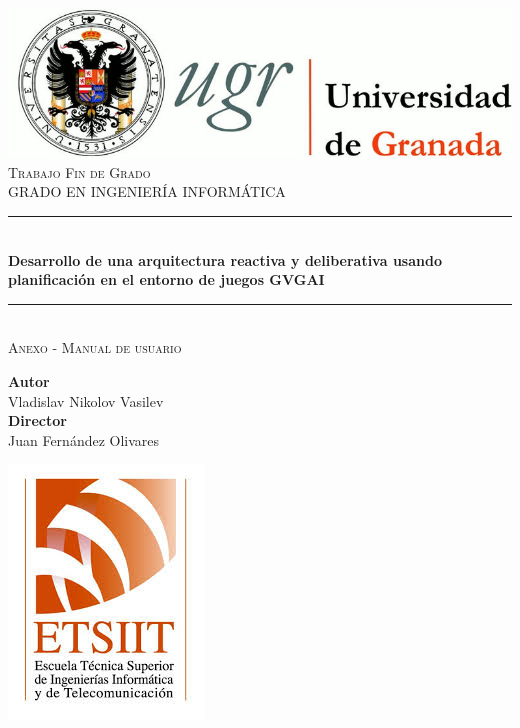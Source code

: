 \documentclass[11pt,a4paper]{article}
\newcommand{\asignatura}{Trabajo Fin de Grado}
\newcommand{\autor}{Vladislav Nikolov Vasilev}
\newcommand{\titulo}{Desarrollo de una arquitectura reactiva y deliberativa
usando planificación en el entorno de juegos GVGAI}
\newcommand{\subtitulo}{Anexo - Manual de usuario}
\newcommand{\director}{Juan Fernández Olivares}
\begin{document}

\begin{titlepage}

\begin{minipage}{\textwidth}

\centering

\includegraphics[scale=0.3]{img/logo_ugr.jpg}\\[1cm]

\textsc{\Large \asignatura{}\\[0.2cm]}
\textsc{GRADO EN INGENIERÍA INFORMÁTICA}\\[1cm]

\noindent\rule[-1ex]{\textwidth}{1pt}\\[1.5ex]
\textbf{{\Large \titulo\\[0.5ex]}}
\noindent\rule[-1ex]{\textwidth}{3pt}\\[3.5ex]
\textsc{{\Large \subtitulo\\[0.5ex]}}

\end{minipage}

\vspace{0.7cm}

\begin{minipage}{\textwidth}

\centering

\textbf{Autor}\\ {\autor{}}\\[2.5ex]
\textbf{Director}\\ {\director}\\[2.5ex]
\vspace{0.3cm}

\includegraphics[scale=0.3]{img/etsiit.jpeg}


\end{minipage}
\end{titlepage}
\end{document}
